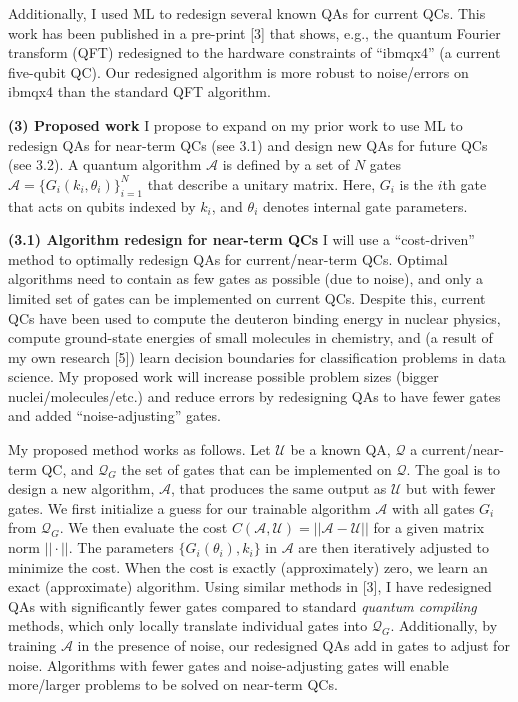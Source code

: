 \documentclass[12pt]{article}
\renewcommand{\>}{\rangle}
\newcommand{\tab}{\hspace*{0.8em}}
\begin{document}
\noindent
\tab Additionally, I used ML to redesign several known QAs for current QCs. This work has been published in a pre-print [3] that shows, e.g., the quantum Fourier transform (QFT) redesigned to the hardware constraints of ``ibmqx4'' (a current five-qubit QC). Our redesigned algorithm is more robust to noise/errors on ibmqx4 than the standard QFT algorithm.

\noindent
\textbf{(3) Proposed work} \tab I propose to expand on my prior work to use ML to redesign QAs for near-term QCs (see 3.1) and design new QAs for future QCs (see 3.2). A quantum algorithm $\mathcal{A}$ is defined by a set of $N$ gates $\mathcal{A} = \{ G_i(k_i, \theta_i)\}_{i = 1}^{N}$ that describe a unitary matrix. Here, $G_i$ is the $i$th gate that acts on qubits indexed by $k_i$, and $\theta_i$ denotes internal gate parameters.

\noindent
\textbf{(3.1) Algorithm redesign for near-term QCs} \tab I will use a ``cost-driven'' method to optimally redesign QAs for current/near-term QCs. Optimal algorithms need to contain as few gates as possible (due to noise), and only a limited set of gates can be implemented on current QCs. Despite this, current QCs have been used to compute the deuteron binding energy in nuclear physics, compute ground-state energies of small molecules in chemistry, and (a result of my own research [5]) learn decision boundaries for classification problems in data science. My proposed work will increase possible problem sizes (bigger nuclei/molecules/etc.) and reduce errors by redesigning QAs to have fewer gates and added ``noise-adjusting'' gates.

\noindent 
\tab My proposed method works as follows. Let $\mathcal{U}$ be a known QA, $\mathcal{Q}$ a current/near-term QC, and $\mathcal{Q}_G$ the set of gates that can be implemented on $\mathcal{Q}$. The goal is to design a new algorithm, $\mathcal{A}$, that produces the same output as $\mathcal{U}$ but with fewer gates. We first initialize a guess for our trainable algorithm $\mathcal{A}$ with all gates $G_i$ from $\mathcal{Q}_G$. We then evaluate the cost $C(\mathcal{A}, \mathcal{U}) = || \mathcal{A} -  \mathcal{U} ||$ for a given matrix norm $|| \cdot ||$. The parameters $\{G_i(\theta_i), k_i\}$ in $\mathcal{A}$ are then iteratively adjusted to minimize the cost. When the cost is exactly (approximately) zero, we learn an exact (approximate) algorithm. Using similar methods in [3], I have redesigned QAs with significantly fewer gates compared to standard \textit{quantum compiling} methods, which only locally translate individual gates into $\mathcal{Q}_G$. Additionally, by training $\mathcal{A}$ in the presence of noise, our redesigned QAs add in gates to adjust for noise. Algorithms with fewer gates and noise-adjusting gates will enable more/larger problems to be solved on near-term QCs.
\end{document}
